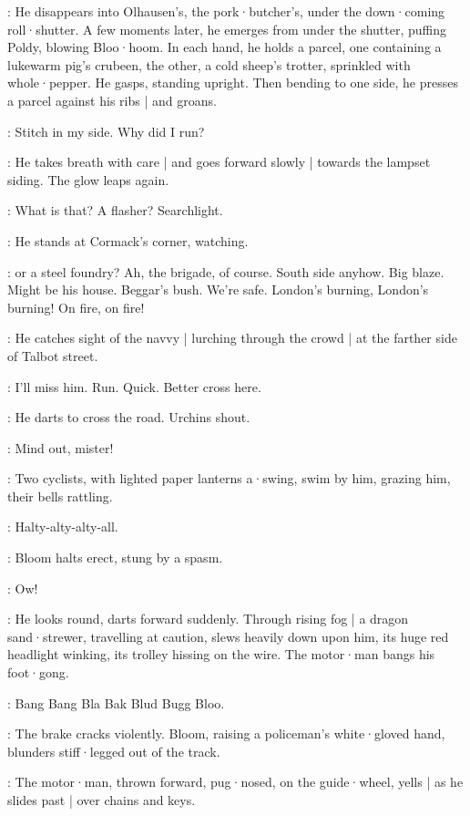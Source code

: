 :
He disappears into Olhausen's,
the pork·butcher's,
under the down·coming roll·shutter.
A few moments later,
he emerges from under the shutter,
puffing Poldy,
blowing Bloo·hoom.
In each hand,
he holds a parcel,
one containing a lukewarm pig's crubeen,
the other,
a cold sheep's trotter,
sprinkled with whole·pepper.
He gasps,
standing upright.
Then bending to one side,
he presses a parcel against his ribs |
and groans.

\Bloom:
Stitch in my side.
Why did I run?

:
He takes breath with care |
and goes forward slowly |
towards the lampset siding.
The glow leaps again.

\Bloom:
What is that?
A flasher?
Searchlight.

:
He stands at Cormack's corner,
watching.

\Bloom:
or a steel foundry?
Ah,
the brigade,
of course.
South side anyhow.
Big blaze.
Might be his house.
Beggar's bush.
We're safe.
London's burning,
London's burning!
On fire,
on fire!

:
He catches sight of the navvy |
lurching through the crowd |
at the farther side of Talbot street.

\Bloom:
I'll miss him.
Run.
Quick.
Better cross here.

:
He darts to cross the road.
Urchins shout.

\Urchins:
Mind out,
mister!

:
Two cyclists,
with lighted paper lanterns a·swing,
swim by him,
grazing him,
their bells rattling.

\Bells:
Halty-alty-alty-all.

:
Bloom halts erect,
stung by a spasm.

\Bloom:
Ow!

:
He looks round,
darts forward suddenly.
Through rising fog |
a dragon sand·strewer,
travelling at caution,
slews heavily down upon him,
its huge red headlight winking,
its trolley hissing on the wire.
The motor·man bangs his foot·gong.

\Gong:
Bang Bang Bla Bak Blud Bugg Bloo.

:
The brake cracks violently.
Bloom,
raising a policeman's white·gloved hand,
blunders stiff·legged out of the track.

:
The motor·man,
thrown forward,
pug·nosed,
on the guide·wheel,
yells |
as he slides past |
over chains and keys.

